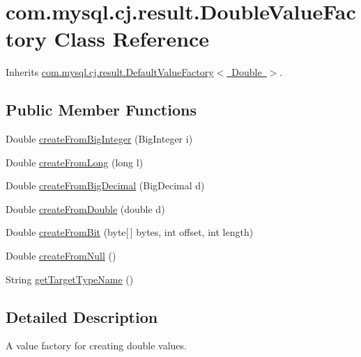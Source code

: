 \hypertarget{classcom_1_1mysql_1_1cj_1_1result_1_1_double_value_factory}{}\section{com.\+mysql.\+cj.\+result.\+Double\+Value\+Factory Class Reference}
\label{classcom_1_1mysql_1_1cj_1_1result_1_1_double_value_factory}


Inherits \mbox{\hyperlink{classcom_1_1mysql_1_1cj_1_1result_1_1_default_value_factory}{com.\+mysql.\+cj.\+result.\+Default\+Value\+Factory$<$ Double $>$}}.

\subsection*{Public Member Functions}
\begin{DoxyCompactItemize}
\item 
Double \mbox{\hyperlink{classcom_1_1mysql_1_1cj_1_1result_1_1_double_value_factory_a63041f6dad46ed82d1cf81dbe1d041be}{create\+From\+Big\+Integer}} (Big\+Integer i)
\item 
Double \mbox{\hyperlink{classcom_1_1mysql_1_1cj_1_1result_1_1_double_value_factory_aadbf2f21bdf6bca3380d46e4f47780c1}{create\+From\+Long}} (long l)
\item 
Double \mbox{\hyperlink{classcom_1_1mysql_1_1cj_1_1result_1_1_double_value_factory_a12fe2f8fe42275c891749991a20b4f11}{create\+From\+Big\+Decimal}} (Big\+Decimal d)
\item 
Double \mbox{\hyperlink{classcom_1_1mysql_1_1cj_1_1result_1_1_double_value_factory_afdb0f1be1d40b15338a923714394deb2}{create\+From\+Double}} (double d)
\item 
Double \mbox{\hyperlink{classcom_1_1mysql_1_1cj_1_1result_1_1_double_value_factory_a3ee4ad7f8d4b82b9c0bad399d5ef3a98}{create\+From\+Bit}} (byte\mbox{[}$\,$\mbox{]} bytes, int offset, int length)
\item 
Double \mbox{\hyperlink{classcom_1_1mysql_1_1cj_1_1result_1_1_double_value_factory_abc9307df0c4777e40c08e1dd23191852}{create\+From\+Null}} ()
\item 
String \mbox{\hyperlink{classcom_1_1mysql_1_1cj_1_1result_1_1_double_value_factory_a976248bbfa84d98a793d29554ec03465}{get\+Target\+Type\+Name}} ()
\end{DoxyCompactItemize}


\subsection{Detailed Description}
A value factory for creating double values. 

